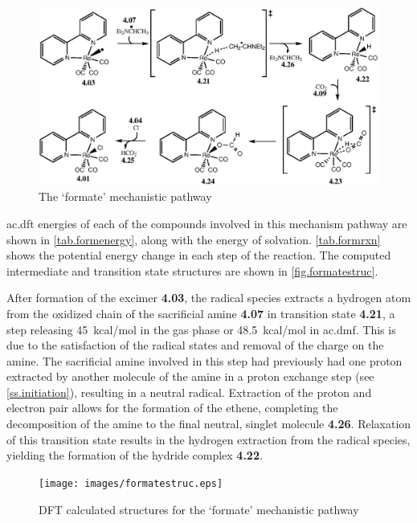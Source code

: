 \begin{figure}[!htb]
 \begin{center}
  \includegraphics[clip=true, width=\textwidth, keepaspectratio]{images/formate.eps}
 \end{center}
\caption{The `formate' mechanistic pathway}
\label{fig.formate}
\end{figure} 

\Gls{ac.dft} energies of each of the compounds involved in this mechanism pathway are shown in \autoref{tab.formenergy}, along with the energy of solvation. \autoref{tab.formrxn} shows the potential energy change in each step of the reaction. The computed intermediate and transition state structures are shown in \autoref{fig.formatestruc}.




After formation of the excimer \textbf{4.03}, the radical species extracts a hydrogen atom from the oxidized chain of the sacrificial amine \textbf{4.07} in transition state \textbf{4.21}, a step releasing 45~kcal/mol in the gas phase or 48.5~kcal/mol in \gls{ac.dmf}. This is due to the satisfaction of the radical states and removal of the charge on the amine. The sacrificial amine involved in this step had previously had one proton extracted by another molecule of the amine in a proton exchange step (see \autoref{ss.initiation}), resulting in a neutral radical. Extraction of the proton and electron pair allows for the formation of the ethene, completing the decomposition of the amine to the final neutral, singlet molecule \textbf{4.26}. Relaxation of this transition state results in the hydrogen extraction from the radical species, yielding the formation of the hydride complex \textbf{4.22}.

\begin{figure}[!ht]
 \begin{center}
  \texttt{[image: images/formatestruc.eps]}
 \end{center}
\caption{DFT calculated structures for the `formate' mechanistic pathway}
\label{fig.formatestruc}
\end{figure} 

